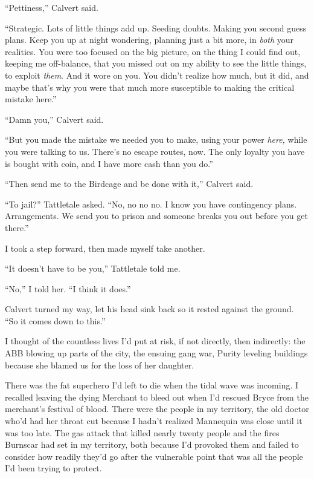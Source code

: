 ``Pettiness,'' Calvert said.



``Strategic.  Lots of little things add up.  Seeding doubts.  Making you second guess plans.  Keep you up at night wondering, planning just a bit more, in \emph{both} your realities.  You were too focused on the big picture, on the thing I could find out, keeping me off-balance, that you missed out on my ability to see the little things, to exploit \emph{them}.  And it wore on you.  You didn't realize how much, but it did, and maybe that's why you were that much more susceptible to making the critical mistake here.''



``Damn you,'' Calvert said.



``But you made the mistake we needed you to make, using your power \emph{here, }while you were talking to us.  There's no escape routes, now.  The only loyalty you have is bought with coin, and I have more cash than you do.''



``Then send me to the Birdcage and be done with it,'' Calvert said.



``To jail?'' Tattletale asked.  ``No, no no no.  I know you have contingency plans.  Arrangements.  We send you to prison and someone breaks you out before you get there.''



I took a step forward, then made myself take another.



``It doesn't have to be you,'' Tattletale told me.



``No,'' I told her.  ``I think it does.''



Calvert turned my way, let his head sink back so it rested against the ground.  ``So it comes down to this.''



I thought of the countless lives I'd put at risk, if not directly, then indirectly: the ABB blowing up parts of the city, the ensuing gang war, Purity leveling buildings because she blamed us for the loss of her daughter.



There was the fat superhero I'd left to die when the tidal wave was incoming.  I recalled leaving the dying Merchant to bleed out when I'd rescued Bryce from the merchant's festival of blood.  There were the people in my territory, the old doctor who'd had her throat cut because I hadn't realized Mannequin was close until it was too late.  The gas attack that killed nearly twenty people and the fires Burnscar had set in my territory, both because I'd provoked them and failed to consider how readily they'd go after the vulnerable point that was all the people I'd been trying to protect.



